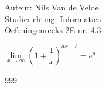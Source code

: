 \documentclass[a4paper]{article}
\begin{document}
  
\noindent \large Auteur: Nils Van de Velde \\
\noindent \large Studierichting: Informatica\\
\noindent \large Oefeningenreeks 2E nr. 4.3\\

\medskip

\normalsize

$\lim\limits_{x \rightarrow \infty}\left(1+\dfrac{1}{x}\right)^{ax+b}  = e^a$\\

\begin{thebibliography}{999}
\end{thebibliography}
\end{document}
